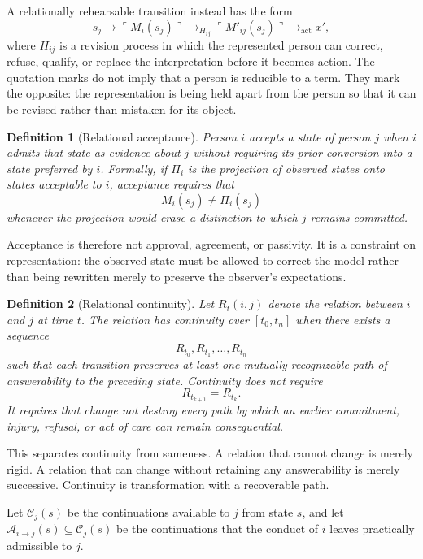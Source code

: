 \documentclass[11pt]{article}
\newtheorem{definition}{Definition}
\theoremstyle{remark}
\newcommand{\ql}{\ulcorner}
\newcommand{\qr}{\urcorner}
\newcommand{\quo}[1]{\ql #1\qr}
\begin{document}
A relationally rehearsable transition instead has the form
\[
s_j \longrightarrow \quo{M_i(s_j)}
\longrightarrow_{H_{ij}} \quo{M'_{ij}(s_j)}
\longrightarrow_{\mathrm{act}} x',
\]
where $H_{ij}$ is a revision process in which the represented person can correct, refuse, qualify, or replace the interpretation before it becomes action. The quotation marks do not imply that a person is reducible to a term. They mark the opposite: the representation is being held apart from the person so that it can be revised rather than mistaken for its object.

\begin{definition}[Relational acceptance]
Person $i$ \emph{accepts} a state of person $j$ when $i$ admits that state as evidence about $j$ without requiring its prior conversion into a state preferred by $i$. Formally, if $\Pi_i$ is the projection of observed states onto states acceptable to $i$, acceptance requires that
\[
M_i(s_j) \neq \Pi_i(s_j)
\]
whenever the projection would erase a distinction to which $j$ remains committed.
\end{definition}

Acceptance is therefore not approval, agreement, or passivity. It is a constraint on representation: the observed state must be allowed to correct the model rather than being rewritten merely to preserve the observer's expectations.

\begin{definition}[Relational continuity]
Let $R_t(i,j)$ denote the relation between $i$ and $j$ at time $t$. The relation has \emph{continuity} over $[t_0,t_n]$ when there exists a sequence
\[
R_{t_0},R_{t_1},\ldots,R_{t_n}
\]
such that each transition preserves at least one mutually recognizable path of answerability to the preceding state. Continuity does not require
\[
R_{t_{k+1}}=R_{t_k}.
\]
It requires that change not destroy every path by which an earlier commitment, injury, refusal, or act of care can remain consequential.
\end{definition}

This separates continuity from sameness. A relation that cannot change is merely rigid. A relation that can change without retaining any answerability is merely successive. Continuity is transformation with a recoverable path.

Let $\mathcal{C}_j(s)$ be the continuations available to $j$ from state $s$, and let $\mathcal{A}_{i\to j}(s)\subseteq\mathcal{C}_j(s)$ be the continuations that the conduct of $i$ leaves practically admissible to $j$.
\end{document}
